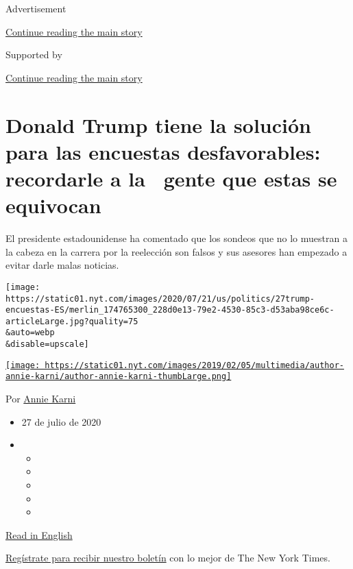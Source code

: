 Advertisement

\protect\hyperlink{after-top}{Continue reading the main story}

Supported by

\protect\hyperlink{after-sponsor}{Continue reading the main story}

\hypertarget{donald-trump-tiene-la-soluciuxf3n-para-las-encuestas-desfavorables-recordarle-a-la--gente-que-estas-se-equivocan}{%
\section{Donald Trump tiene la solución para las encuestas
desfavorables: recordarle a la~ gente que estas se
equivocan}\label{donald-trump-tiene-la-soluciuxf3n-para-las-encuestas-desfavorables-recordarle-a-la--gente-que-estas-se-equivocan}}

El presidente estadounidense ha comentado que los sondeos que no lo
muestran a la cabeza en la carrera por la reelección son falsos y sus
asesores han empezado a evitar darle malas noticias.

\texttt{[image: https://static01.nyt.com/images/2020/07/21/us/politics/27trump-encuestas-ES/merlin\_174765300\_228d0e13-79e2-4530-85c3-d53aba98ce6c-articleLarge.jpg?quality=75\\\&auto=webp\\\&disable=upscale]}

\href{https://www.nytimes.com/by/annie-karni}{\texttt{[image: https://static01.nyt.com/images/2019/02/05/multimedia/author-annie-karni/author-annie-karni-thumbLarge.png]}}

Por \href{https://www.nytimes.com/by/annie-karni}{Annie Karni}

\begin{itemize}
\item
  27 de julio de 2020
\item
  \begin{itemize}
  \item
  \item
  \item
  \item
  \item
  \end{itemize}
\end{itemize}

\href{https://www.nytimes.com/2020/07/22/us/politics/trump-polls-2020.html}{Read
in English}

\href{https://www.nytimes.com/newsletters/el-times}{Regístrate para
recibir nuestro boletín} con lo mejor de The New York Times.

